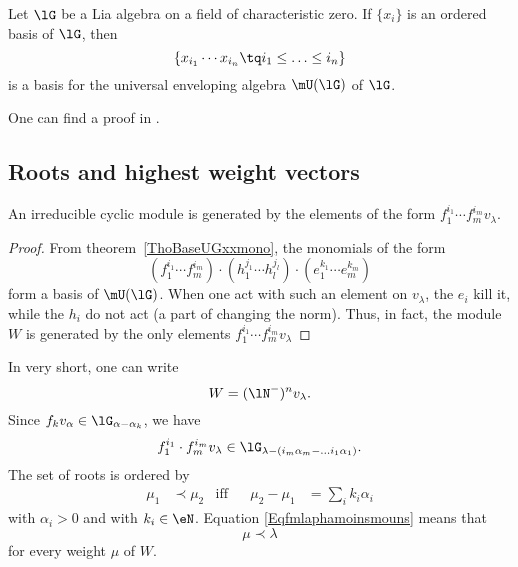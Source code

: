 \begin{theorem}     \label{ThoBaseUGxxmono}
	Let $\lG$ be a Lia algebra on a field of characteristic zero. If $\{ x_i \}$ is an ordered basis of $\lG$, then
	\begin{equation}
		\{ x_{i_1}\cdots x_{i_n}\tq i_1\leq\ldots\leq i_n \}
	\end{equation}
	is a basis for the universal enveloping algebra $\mU(\lG)$ of $\lG$.
\end{theorem}
One can find a proof in \cite{DirkEnvFiniteDimNilLieAlg}.

\subsection{Roots and highest weight vectors}

\begin{proposition}     \label{PropoIrrrgenffflamble}
	An irreducible cyclic module is generated by the elements of the form $f_1^{i_1}\cdots f_m^{i_m}v_{\lambda}$.
\end{proposition}

\begin{proof}
	From theorem~\ref{ThoBaseUGxxmono}, the monomials of the form
	\begin{equation}
		(f_1^{i_1}\cdots f_m^{i_m})\cdot (h_1^{j_1}\cdots h_l^{j_l})\cdot (e_1^{k_1}\cdots e_m^{k_m})
	\end{equation}
	form a basis of $\mU(\lG)$. When one act with such an element on $v_{\lambda}$, the $e_i$ kill it, while the $h_i$ do not act (a part of changing the norm). Thus, in fact, the module $W$ is generated by the only elements $f_1^{i_1}\cdots f_m^{i_m}v_{\lambda}$
\end{proof}
In very short, one can write
\begin{equation}        \label{EqWnmoinvlambldarootmodul}
	W=(\lN^-)^nv_{\lambda}.
\end{equation}
Since $f_kv_{\alpha}\in\lG_{\alpha-\alpha_k}$, we have
\begin{equation}        \label{Eqfmlaphamoinsmouns}
	f_1^{i_1}\cdot f_m^{i_m}v_{\lambda}\in\lG_{\lambda-(i_m\alpha_m-\ldots i_1\alpha_1)}.
\end{equation}
The set of roots is ordered by
\begin{equation}
	\begin{aligned}
		\mu_1 & \prec\mu_2 & \text{iff} &  & \mu_2-\mu_1 & =\sum_i k_i\alpha_i
	\end{aligned}
\end{equation}
with $\alpha_i>0$ and with $k_i\in\eN$. Equation \eqref{Eqfmlaphamoinsmouns} means that
\begin{equation}
	\mu\prec\lambda
\end{equation}
for every weight $\mu$ of $W$.

